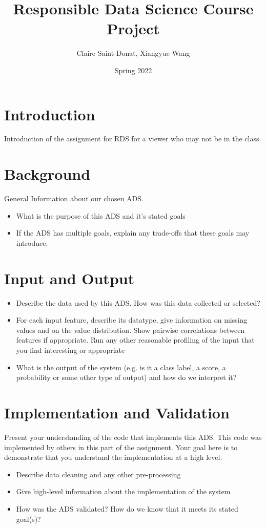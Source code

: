 \documentclass[11pt]{article}
\title{Responsible Data Science Course Project}
\author{Claire Saint-Donat, Xiangyue Wang}
\date{Spring 2022}
\begin{document}
\maketitle
\tableofcontents

\section{Introduction}

Introduction of the assignment for RDS for a viewer who may not be in the class.

\pagebreak

\section{Background}

General Information about our chosen ADS.
\begin{itemize}
\item What is the purpose of this ADS and it's stated goals
\item If the ADS has multiple goals, explain any trade-offs that these goals may introduce.
\end{itemize}

\pagebreak

\section{Input and Output}

\begin{itemize}
	\item Describe the data used by this ADS.  How was this data collected or selected?
	\item For each input feature, describe its datatype, give information on missing values and on the value distribution. Show pairwise correlations between features if appropriate.  Run any other reasonable profiling of the input that you find interesting or appropriate
	\item What is the output of the system (e.g. is it a class label, a score, a probability or some other type of output) and how do we interpret it?
\end{itemize}

\pagebreak

\section{Implementation and Validation}
Present your understanding of the code that implements this ADS.  This code was implemented by others in this part of the assignment.  Your goal here is to demonstrate that you understand the implementation at a high level.
\begin{itemize}
\item Describe data cleaning and any other pre-processing
\item Give high-level information about the implementation of the system
\item How was the ADS validated?  How do we know that it meets its stated goal(s)?
\end{itemize}
\end{document}
